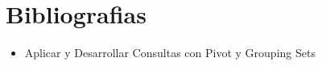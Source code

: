 \section{Bibliografias} 


\begin{itemize}
\item Aplicar y Desarrollar  Consultas con Pivot y Grouping Sets



\end{itemize}